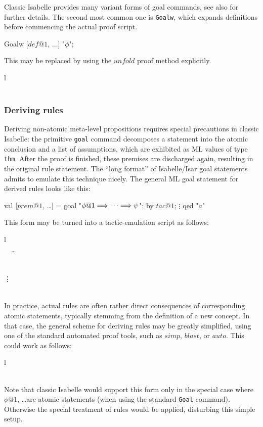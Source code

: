 \medskip Classic Isabelle provides many variant forms of goal commands, see
also \cite{isabelle-ref} for further details.  The second most common one is
\texttt{Goalw}, which expands definitions before commencing the actual proof
script.
\begin{ttbox}
 Goalw [\(def@1\), \(\dots\)] "\(\phi\)";
\end{ttbox}
This may be replaced by using the $unfold$ proof method explicitly.
\begin{matharray}{l}
 \\
\quad {} \\
\end{matharray}


\subsubsection{Deriving rules}

Deriving non-atomic meta-level propositions requires special precautions in
classic Isabelle: the primitive \texttt{goal} command decomposes a statement
into the atomic conclusion and a list of assumptions, which are exhibited as
ML values of type \texttt{thm}.  After the proof is finished, these premises
are discharged again, resulting in the original rule statement.  The ``long
format'' of Isabelle/Isar goal statements admits to emulate this technique
nicely.  The general ML goal statement for derived rules looks like this:
\begin{ttbox}
 val [\(prem@1\), \dots] = goal "\(\phi@1 \Imp \dots \Imp \psi\)";
 by \(tac@1\);
   \(\vdots\)
 qed "\(a\)"
\end{ttbox}
This form may be turned into a tactic-emulation script as follows:
\begin{matharray}{l}
   \\
  \quad {}~\AND~\dots \\
  \quad {} \\
  \qquad {} \\
  \qquad\quad \vdots \\
  \qquad \DONE \\
\end{matharray}

\medskip In practice, actual rules are often rather direct consequences of
corresponding atomic statements, typically stemming from the definition of a
new concept.  In that case, the general scheme for deriving rules may be
greatly simplified, using one of the standard automated proof tools, such as
$simp$, $blast$, or $auto$.  This could work as follows:
\begin{matharray}{l}
   \\
  \quad {} \\
\end{matharray}
Note that classic Isabelle would support this form only in the special case
where $\phi@1$, \dots are atomic statements (when using the standard
\texttt{Goal} command).  Otherwise the special treatment of rules would be
applied, disturbing this simple setup.

